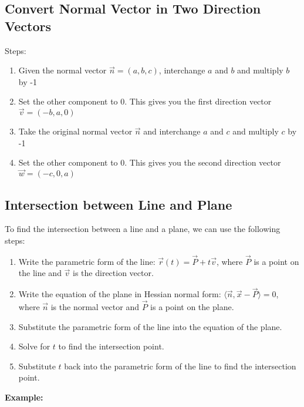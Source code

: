 \subsection{Convert Normal Vector in Two Direction Vectors}
Steps:
\begin{enumerate}
	\item Given the normal vector \(\vec{n} = (a, b, c)\), interchange \(a\) and \(b\) and multiply \(b\) by -1
	\item Set the other component to 0. This gives you the first direction vector \(\vec{v} = (-b, a, 0)\)
	\item Take the original normal vector \(\vec{n}\) and interchange \(a\) and \(c\) and multiply \(c\) by -1
	\item Set the other component to 0. This gives you the second direction vector \(\vec{w} = (-c, 0, a)\)
\end{enumerate}

\subsection{Intersection between Line and Plane}
To find the intersection between a line and a plane, we can use the following steps:
\begin{enumerate}
	\item Write the parametric form of the line: \(\vec{r}(t) = \vec{P} + t\vec{v}\), where \(\vec{P}\) is a point on the line and \(\vec{v}\) is the direction vector.
	\item Write the equation of the plane in Hessian normal form: \(\langle \vec{n}, \vec{x} - \vec{P} \rangle = 0\), where \(\vec{n}\) is the normal vector and \(\vec{P}\) is a point on the plane.
	\item Substitute the parametric form of the line into the equation of the plane.
	\item Solve for \(t\) to find the intersection point.
	\item Substitute \(t\) back into the parametric form of the line to find the intersection point.
\end{enumerate}
\textbf{Example:}
\vspace{\baselineskip}

